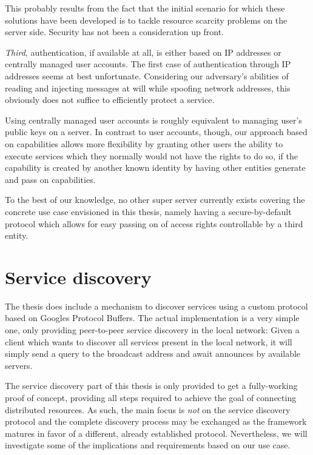This probably results from the fact that the initial scenario for which these solutions have been developed is to tackle resource scarcity problems on the server side.
Security has not been a consideration up front.

\emph{Third}, authentication, if available at all, is either based on IP addresses or centrally managed user accounts.
The first case of authentication through IP addresses seems at best unfortunate.
Considering our adversary's abilities of reading and injecting messages at will while spoofing network addresses, this obviously does not suffice to efficiently protect a service.

Using centrally managed user accounts is roughly equivalent to managing user's public keys on a server.
In contrast to user accounts, though, our approach based on capabilities allows more flexibility by granting other users the ability to execute services which they normally would not have the rights to do so, if the capability is created by another known identity by having other entities generate and pass on capabilities.

To the best of our knowledge, no other super server currently exists covering the concrete use case envisioned in this thesis, namely having a secure-by-default protocol which allows for easy passing on of access rights controllable by a third entity.

\section{Service discovery}

The thesis does include a mechanism to discover services using a custom protocol based on Googles Protocol Buffers.
The actual implementation is a very simple one, only providing peer-to-peer service discovery in the local network:
Given a client which wants to discover all services present in the local network, it will simply send a query to the broadcast address and await announces by available servers.

The service discovery part of this thesis is only provided to get a fully-working proof of concept, providing all steps required to achieve the goal of connecting distributed resources.
As such, the main focus is \emph{not} on the service discovery protocol and the complete discovery process may be exchanged as the framework matures in favor of a different, already established protocol.
Nevertheless, we will investigate some of the implications and requirements based on our use case.

